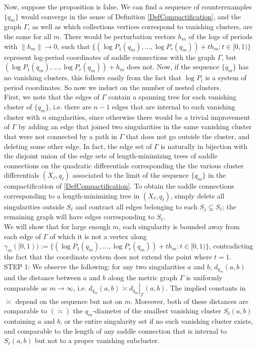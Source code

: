 \documentclass[12pt]{article}
\begin{document}
\noindent Now, suppose the proposition is false. We can find a sequence of counterexamples $\{q_m\}$ would converge in the sense of Definition \ref{DefCompactification}, and the graph $\Gamma$, as well as which collections vertices correspond to vanishing clusters, are the same for all $m$. There would be perturbation vectors $h_m$ of the logs of periods with $\|h_m\| \to 0$, such that $\{(\log P_1(q_m),...,\log P_r(q_m)) + t h_m: t \in [0,1)\}$ represent log-period coordinates of saddle connections with the graph $\Gamma$, but $(\log P_1(q_m),...,\log P_r(q_m)) + h_m$ does not. Now, if the sequence $\{q_m\}$ has no vanishing clusters, this follows easily from the fact that $\log P_i$ is a system of period coordinates. So now we induct on the number of nested clusters.\\

\noindent First, we note that the edges of $\Gamma$ contain a spanning tree for each vanishing cluster of $\{q_m\}$, i.e. there are $n-1$ edges that are internal to each vanishing cluster with $n$ singularities, since otherwise there would be a trivial improvement of $\Gamma$ by adding an edge that joined two singularities in the same vanishing cluster that were not connected by a path in $\Gamma$ that does not go outside the cluster, and deleting some other edge. In fact, the edge set of $\Gamma$ is naturally in bijection with the disjoint union of the edge sets of length-minimizing trees of saddle connections on the quadratic differentials corresponding the the various cluster differentials $(X_\ell,q_\ell)$ associated to the limit of the sequence $\{q_m\}$ in the compactification of \ref{DefCompactification}. To obtain the saddle connections corresponding to a length-minimizing tree in $(X_\ell,q_\ell)$, simply delete all singularities outside $S_\ell$ and contract all edges belonging to each $S_j \subsetneq S_\ell$; the remaining graph will have edges corresponding to $S_\ell$.\\

\noindent We will show that for large enough $m$, each singularity is bounded away from each edge of $\Gamma$ of which it is not a vertex along $\gamma_m([0,1)) := \{(\log P_1(q_m),...,\log P_r(q_m)) + t h_m: t \in [0,1)\}$, contradicting the fact that the coordinate system does not extend the point where $t = 1$.\\

\noindent STEP 1: We observe the following: for any two singularities $a$ and $b$, $d_{q_m}(a,b)$ and the distance between $a$ and $b$ along the metric graph $\Gamma$ is uniformly comparable as $m \to \infty$, i.e. $d_{q_m}(a,b) \dot{\asymp} \left. d_{q_m} \right|_\Gamma(a,b)$. The implied constants in $\dot{\asymp}$ depend on the sequence but not on $m$. Moreover, both of these distances are comparable to $(\dot{\asymp})$ the $q_m$-diameter of the smallest vanishing cluster $S_\ell(a,b)$ containing $a$ and $b$, or the entire singularity set if no such vanishing cluster exists, and comparable to the length of any saddle connection that is internal to $S_\ell(a,b)$ but not to a proper vanishing subcluster.\\
\end{document}
